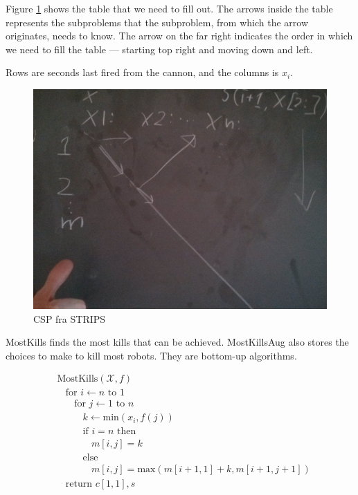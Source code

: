 \documentclass[koma,a4paper]{article}
\begin{document}
Figure \ref{fig:ex_2_table} shows the table that we need to fill out. The arrows inside the table represents the subproblems that the subproblem, from which the arrow originates, needs to know. The arrow on the far right indicates the order in which we need to fill the table --- starting top right and moving down and left.

Rows are seconds last fired from the cannon, and the columns is $x_i$.

\begin{figure}[htbp]
  \centering
  \includegraphics[width=1\textwidth]{ex_2_table}
  \caption{CSP fra STRIPS}\label{fig:ex_2_table}
\end{figure}

MostKills finds the most kills that can be achieved. MostKillsAug also stores the choices to make to kill most robots. They are bottom-up algorithms.

\begin{align*}
  &\text{MostKills}(\mathcal{X}, f)\\
  &~~~~\text{for } i \leftarrow n \text{ to } 1\\
  &~~~~~~~~\text{for } j \leftarrow 1 \text{ to } n\\
  &~~~~~~~~~~~~k \leftarrow \text{min}(x_i, f(j))\\
  &~~~~~~~~~~~~\text{if } i = n \text{ then}\\
  &~~~~~~~~~~~~~~~~m[i, j] = k\\
  &~~~~~~~~~~~~\text{else }\\
  &~~~~~~~~~~~~~~~~m[i, j] = \text{max}(m[i + 1, 1] + k, m[i + 1, j + 1])\\
  &~~~~\text{return } c[1, 1], s
\end{align*}
\end{document}
